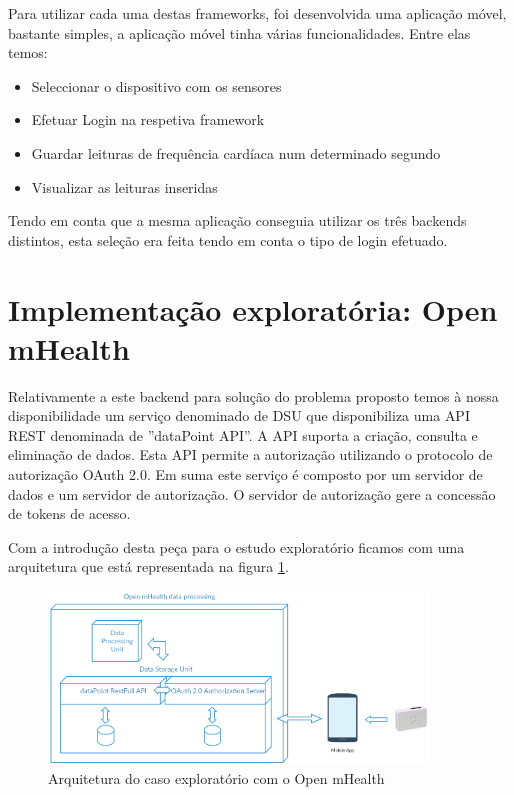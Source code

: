 Para utilizar cada uma destas frameworks, foi desenvolvida uma aplicação móvel, bastante simples, a aplicação móvel tinha várias funcionalidades. Entre elas temos:
\begin{itemize}
  \item Seleccionar o dispositivo com os sensores
  \item Efetuar Login na respetiva framework
  \item Guardar leituras de frequência cardíaca num determinado segundo
  \item Visualizar as leituras inseridas
\end{itemize}

Tendo em conta que a mesma aplicação conseguia utilizar os três backends distintos, esta seleção era feita tendo em conta o tipo de login efetuado.


\section{Implementação exploratória: Open mHealth}
Relativamente a este backend para solução do problema proposto temos à nossa disponibilidade um serviço denominado de \gls{DSU} que disponibiliza uma \gls{API} \gls{REST} denominada de ''dataPoint API''. A \gls{API} suporta a criação, consulta e eliminação de dados. Esta \gls{API} permite a autorização utilizando o protocolo de autorização OAuth 2.0. Em suma este serviço é composto por um servidor de dados e um servidor de autorização. O servidor de autorização gere a concessão de tokens de acesso. \cite{omhstorage} \par
Com a introdução desta peça para o estudo exploratório ficamos com uma arquitetura que está representada na figura \ref{f:exp-omh-arch}.

\begin{figure}[H]
  \centering
  \includegraphics[width=0.9\textwidth]{imgs/omh-arch-exp.png}
  \caption[Arquitetura do caso exploratório com o Open mHealth]{Arquitetura do caso exploratório com o Open mHealth}
  
  \label{f:exp-omh-arch}
\end{figure}

